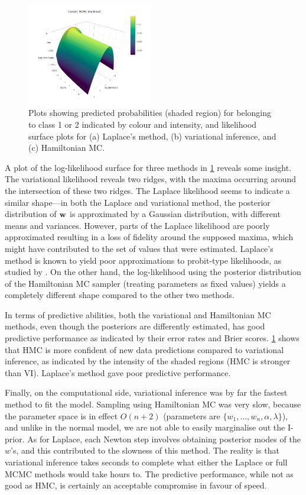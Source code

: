 \begin{figure}[p]
  \includegraphics[width=0.49\textwidth]{figure/05-lik_hmc}
  \caption{Plots showing predicted probabilities (shaded region) for belonging to class 1 or 2 indicated by colour and intensity, and likelihood surface plots for (a) Laplace's method, (b) variational inference, and (c) Hamiltonian MC.}
  \label{fig:exampleiprobitfit}
\end{figure}

A plot of the log-likelihood surface for three methods in \cref{fig:exampleiprobitfit} reveals some insight.
The variational likelihood reveals two ridges, with the maxima occurring around the intersection of these two ridges.
The Laplace likelihood seems to indicate a similar shape---in both the Laplace and variational method, the posterior distribution of ${\mathbf w}$ is approximated by a Gaussian distribution, with different means and variances.
However, parts of the Laplace likelihood are poorly approximated resulting in a loss of fidelity around the supposed maxima, which might have contributed to the set of values that were estimated.
Laplace's method is known to yield poor approximations to probit-type likelihoods, as studied by \citet{kuss2005assessing}.
On the other hand, the log-likelihood using the posterior distribution of the Hamiltonian MC sampler (treating parameters as fixed values) yields a completely different shape compared to the other two methods.

In terms of predictive abilities, both the variational and Hamiltonian MC methods, even though the posteriors are differently estimated, has good predictive performance as indicated by their error rates and Brier scores.
\cref{fig:exampleiprobitfit} shows that HMC is more confident of new data predictions compared to variational inference, as indicated by the intensity of the shaded regions (HMC is stronger than VI).
Laplace's method gave poor predictive performance.

Finally, on the computational side, variational inference was by far the fastest method to fit the model.
Sampling using Hamiltonian MC was very slow, because the parameter space is in effect $O(n + 2)$ (parameters are $\{w_1,\dots,w_n,\alpha,\lambda\}$), and unlike in the normal model, we are not able to easily marginalise out the I-prior.
As for Laplace, each Newton step involves obtaining posterior modes of the $w$'s, and this contributed to the slowness of this method.
The reality is that variational inference takes seconds to complete what either the Laplace or full MCMC methods would take hours to.
The predictive performance, while not as good as HMC, is certainly an acceptable compromise in favour of speed.


